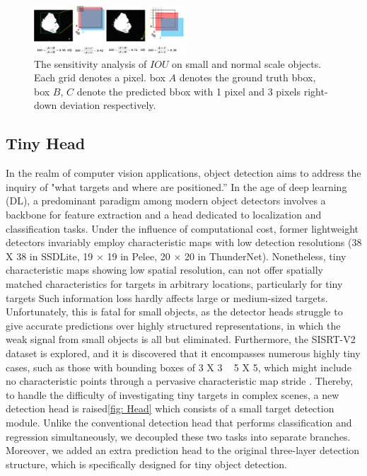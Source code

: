 \documentclass[journal]{IEEEtran}
\begin{document}
\begin{figure}[!t]
    \centering
    \includegraphics[width=0.5\textwidth]{IOU campare}
    
    \caption {The sensitivity analysis of $IOU$ on small and normal scale objects. Each grid denotes a pixel. box $A$ denotes the ground truth bbox, box $B$, $C$ denote the predicted bbox with 1 pixel and 3 pixels right-down deviation respectively.}

    \label{fig: IOU}
\end{figure}

\subsection{Tiny Head } %
In the realm of computer vision applications, object detection aims to address the inquiry of "what targets and where are positioned.” In the age of deep learning (DL), a predominant paradigm among modern object detectors involves a backbone for feature extraction and a head dedicated to localization and classification tasks. Under the influence of computational cost, former lightweight detectors invariably employ characteristic maps with low detection resolutions (38 X 38 in SSDLite, 19 × 19 in Pelee, 20 × 20 in ThunderNet). Nonetheless, tiny characteristic maps showing low spatial resolution, can not offer spatially matched characteristics for targets in arbitrary locations, particularly for tiny targets\cite{chen2023tinydet} Such information loss hardly affects large or medium-sized targets. Unfortunately, this is fatal for small objects, as the detector heads struggle to give accurate predictions over highly structured representations, in which the weak signal from small objects is all but eliminated\cite{zhao2022single}. Furthermore, the SISRT-V2 dataset is explored, and it is discovered that it encompasses numerous highly tiny cases,  such as those with bounding boxes of 3 X 3 ~ 5 X 5, which might include no characteristic points through a pervasive characteristic map stride \cite{dai2023one}. Thereby, to handle the difficulty of investigating tiny targets in complex scenes, a new detection head is raised\ref{fig: Head} which consists of a small target detection module. Unlike the conventional detection head that performs classification and regression simultaneously, we decoupled these two tasks into separate branches. Moreover, we added an extra prediction head to the original three-layer detection structure, which is specifically designed for tiny object detection.
\end{document}
